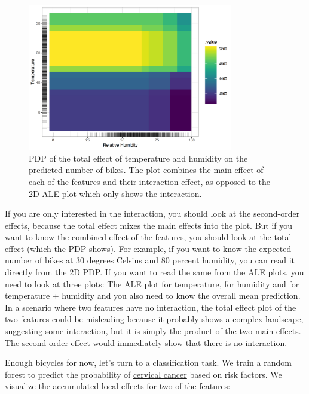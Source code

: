 \documentclass[
  11pt,
]{scrbook}
\begin{document}
\begin{figure}

{\centering \includegraphics[width=0.8\textwidth]{images/pdp-bike-vs-ale-2D-1} 

}

\caption{PDP of the total effect of temperature and humidity on the predicted number of bikes. The plot combines the main effect of each of the features and their interaction effect, as opposed to the 2D-ALE plot which only shows the interaction.}\label{fig:pdp-bike-vs-ale-2D}
\end{figure}

If you are only interested in the interaction, you should look at the second-order effects, because the total effect mixes the main effects into the plot.
But if you want to know the combined effect of the features, you should look at the total effect (which the PDP shows).
For example, if you want to know the expected number of bikes at 30 degrees Celsius and 80 percent humidity, you can read it directly from the 2D PDP.
If you want to read the same from the ALE plots, you need to look at three plots:
The ALE plot for temperature, for humidity and for temperature + humidity and you also need to know the overall mean prediction.
In a scenario where two features have no interaction, the total effect plot of the two features could be misleading because it probably shows a complex landscape, suggesting some interaction, but it is simply the product of the two main effects.
The second-order effect would immediately show that there is no interaction.

Enough bicycles for now, let's turn to a classification task.
We train a random forest to predict the probability of \protect\hyperlink{cervical}{cervical cancer} based on risk factors.
We visualize the accumulated local effects for two of the features:
\end{document}
